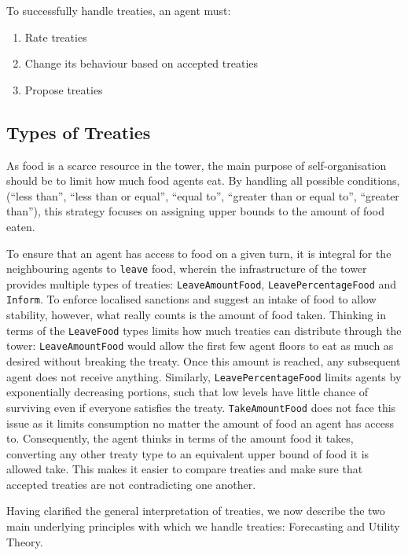 To successfully handle treaties, an agent must:
\begin{enumerate}
    \item Rate treaties
    \item Change its behaviour based on accepted treaties
    \item Propose treaties
\end{enumerate}


\subsection{Types of Treaties}

As food is a scarce resource in the tower, the main purpose of self-organisation should be to limit how much food agents eat. By handling all possible conditions, (``less than'', ``less than or equal'', ``equal to'', ``greater than or equal to'', ``greater than''), this strategy focuses on assigning upper bounds to the amount of food eaten.

To ensure that an agent has access to food on a given turn, it is integral for the neighbouring agents to \texttt{leave} food, wherein the infrastructure of the tower provides multiple types of treaties: \texttt{LeaveAmountFood}, \texttt{LeavePercentageFood} and \texttt{Inform}. To enforce localised sanctions and suggest an intake of food to allow stability, however, what really counts is the amount of food taken. Thinking in terms of the \texttt{LeaveFood} types limits how much treaties can distribute through the tower: \texttt{LeaveAmountFood} would allow the first few agent floors to eat as much as desired without breaking the treaty. Once this amount is reached, any subsequent agent does not receive anything. Similarly, \texttt{LeavePercentageFood} limits agents by exponentially decreasing portions, such that low levels have little chance of surviving even if everyone satisfies the treaty. \texttt{TakeAmountFood} does not face this issue as it limits consumption no matter the amount of food an agent has access to. Consequently, the agent thinks in terms of the amount food it takes, converting any other treaty type to an equivalent upper bound of food it is allowed take. This makes it easier to compare treaties and make sure that accepted treaties are not contradicting one another.

Having clarified the general interpretation of treaties, we now describe the two main underlying principles with which we handle treaties: Forecasting and Utility Theory.

